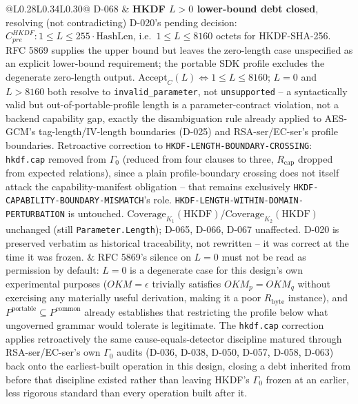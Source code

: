 \documentclass[11pt,a4paper]{article}
\begin{document}
\begin{longtable}{@{}L{0.28\textwidth}L{0.34\textwidth}L{0.30\textwidth}@{}}
D-068 & \textbf{HKDF $L>0$ lower-bound debt closed}, resolving (not contradicting) D-020's pending decision: $C_{pre}^{HKDF}: 1\le L\le 255\cdot\text{HashLen}$, i.e.\ $1\le L\le 8160$ octets for HKDF-SHA-256. RFC 5869 supplies the upper bound but leaves the zero-length case unspecified as an explicit lower-bound requirement; the portable SDK profile excludes the degenerate zero-length output. $\text{Accept}_C(L)\iff 1\le L\le 8160$; $L=0$ and $L>8160$ both resolve to \texttt{invalid\_parameter}, not \texttt{unsupported} -- a syntactically valid but out-of-portable-profile length is a parameter-contract violation, not a backend capability gap, exactly the disambiguation rule already applied to AES-GCM's tag-length/IV-length boundaries (D-025) and RSA-ser/EC-ser's profile boundaries. Retroactive correction to \texttt{HKDF-LENGTH-BOUNDARY-CROSSING}: \texttt{hkdf.cap} removed from $\Gamma_0$ (reduced from four clauses to three, $R_{\text{cap}}$ dropped from expected relations), since a plain profile-boundary crossing does not itself attack the capability-manifest obligation -- that remains exclusively \texttt{HKDF-CAPABILITY-BOUNDARY-MISMATCH}'s role. \texttt{HKDF-LENGTH-WITHIN-DOMAIN-PERTURBATION} is untouched. $\text{Coverage}_{K_1}(\text{HKDF})$/$\text{Coverage}_{K_2}(\text{HKDF})$ unchanged (still \texttt{Parameter.Length}); D-065, D-066, D-067 unaffected. D-020 is preserved verbatim as historical traceability, not rewritten -- it was correct at the time it was frozen. & RFC 5869's silence on $L=0$ must not be read as permission by default: $L=0$ is a degenerate case for this design's own experimental purposes ($OKM=\epsilon$ trivially satisfies $OKM_p=OKM_q$ without exercising any materially useful derivation, making it a poor $R_{\text{byte}}$ instance), and $P^{\text{portable}}\subseteq P^{\text{common}}$ already establishes that restricting the profile below what ungoverned grammar would tolerate is legitimate. The \texttt{hkdf.cap} correction applies retroactively the same cause-equals-detector discipline matured through RSA-ser/EC-ser's own $\Gamma_0$ audits (D-036, D-038, D-050, D-057, D-058, D-063) back onto the earliest-built operation in this design, closing a debt inherited from before that discipline existed rather than leaving HKDF's $\Gamma_0$ frozen at an earlier, less rigorous standard than every operation built after it.\\

\end{longtable}
\end{document}
